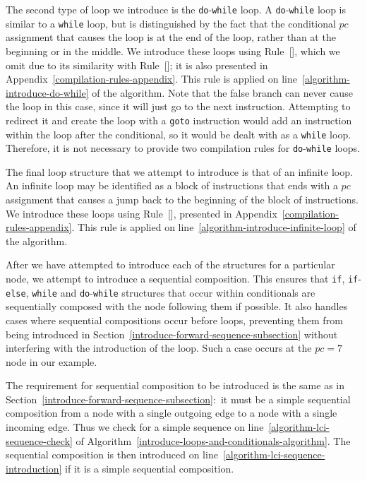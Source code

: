 The second type of loop we introduce is the \texttt{do}-\texttt{while}
loop.
A \texttt{do}-\texttt{while} loop is similar to a \texttt{while} loop,
but is distinguished by the fact that the conditional $pc$ assignment
that causes the loop is at the end of the loop, rather than at the
beginning or in the middle.
We introduce these loops using
Rule~[], which we omit due to its
similarity with Rule~[]; it is also
presented in Appendix~\ref{compilation-rules-appendix}.
This rule is applied on line~\ref{algorithm-introduce-do-while} of the
algorithm.
Note that the false branch can never cause the loop in this case,
since it will just go to the next instruction.
Attempting to redirect it and create the loop with a \texttt{goto}
instruction would add an instruction within the loop after the
conditional, so it would be dealt with as a \texttt{while} loop. 
Therefore, it is not necessary to provide two compilation rules for
\texttt{do}-\texttt{while} loops.

The final loop structure that we attempt to introduce is that of an
infinite loop.
An infinite loop may be identified as a block of instructions that
ends with a $pc$ assignment that causes a jump back to the beginning
of the block of instructions.
We introduce these loops using
Rule~[], presented in
Appendix~\ref{compilation-rules-appendix}.
This rule is applied on line~\ref{algorithm-introduce-infinite-loop}
of the algorithm.

After we have attempted to introduce each of the structures for a
particular node, we attempt to introduce a sequential composition.
This ensures that \texttt{if}, \texttt{if}-\texttt{else},
\texttt{while} and \texttt{do}-\texttt{while} structures that occur
within conditionals are sequentially composed with the node following
them if possible.
It also handles cases where sequential compositions occur before
loops, preventing them from being introduced in
Section~\ref{introduce-forward-sequence-subsection} without
interfering with the introduction of the loop.
Such a case occurs at the $pc=7$ node in our example.

The requirement for sequential composition to be introduced is the
same as in Section~\ref{introduce-forward-sequence-subsection}:~it
must be a simple sequential composition from a node with a single
outgoing edge to a node with a single incoming edge.
Thus we check for a simple sequence on
line~\ref{algorithm-lci-sequence-check} of
Algorithm~\ref{introduce-loops-and-conditionals-algorithm}.
The sequential composition is then introduced on
line~\ref{algorithm-lci-sequence-introduction} if it is a simple
sequential composition.

